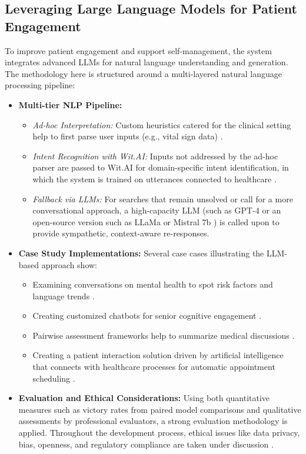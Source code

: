 \subsection{Leveraging Large Language Models for Patient Engagement}
To improve patient engagement and support self-management, the system integrates advanced LLMs for natural language understanding and generation. The methodology here is structured around a multi-layered natural language processing pipeline:
\begin{itemize}[itemsep=2em]
    \item \textbf{Multi-tier NLP Pipeline:} 
          \begin{itemize}[itemsep=2em]
              \item \emph{Ad-hoc Interpretation:} Custom heuristics catered for the clinical setting help to first parse user inputs (e.g., vital sign data) \cite{montagna2023}.
              \item \emph{Intent Recognition with Wit.AI:} Inputs not addressed by the ad-hoc parser are passed to Wit.AI for domain-specific intent identification, in which the system is trained on utterances connected to healthcare \cite{montagna2023}.
              \item \emph{Fallback via LLMs:} For searches that remain unsolved or call for a more conversational approach, a high-capacity LLM (such as GPT-4 \cite{gpt4tech} or an open-source version such as LLaMa \cite{llama2023} or Mistral 7b \cite{mistral7b}) is called upon to provide sympathetic, context-aware re-responses.
          \end{itemize}
    \item \textbf{Case Study Implementations:} Several case cases illustrating the LLM-based approach show:
          \begin{itemize}[itemsep=2em]
              \item Examining conversations on mental health to spot risk factors and language trends \cite{montagna2023, wen2023b}.
              \item Creating customized chatbots for senior cognitive engagement \cite{wen2023b}.
              \item Pairwise assessment frameworks help to summarize medical discussions \cite{dhurandhar2024}.
              \item Creating a patient interaction solution driven by artificial intelligence that connects with healthcare processes for automatic appointment scheduling \cite{montagna2023}.
          \end{itemize}
    \item \textbf{Evaluation and Ethical Considerations:} Using both quantitative measures such as victory rates from paired model comparisons \cite{dhurandhar2024} and qualitative assessments by professional evaluators, a strong evaluation methodology is applied. Throughout the development process, ethical issues like data privacy, bias, openness, and regulatory compliance are taken under discussion \cite{ueda2024, kiseleva2022}.
\end{itemize}

